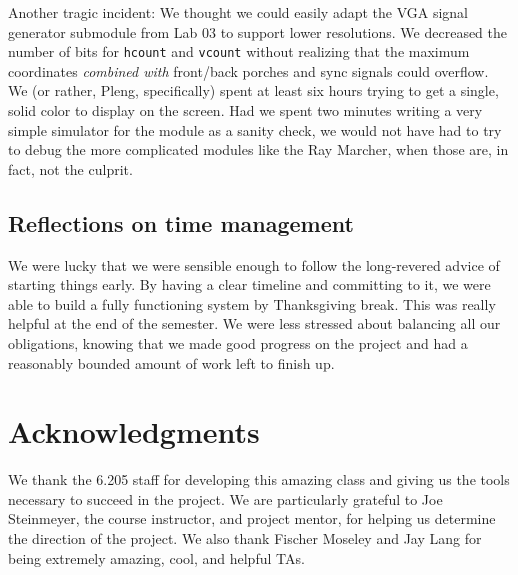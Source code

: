 \documentclass[conference]{IEEEtran}
\begin{document}
Another tragic incident: We thought we could easily adapt the VGA signal generator submodule from Lab 03 to support lower resolutions. We decreased the number of bits for \texttt{hcount} and \texttt{vcount} without realizing that the maximum coordinates \textit{combined with} front/back porches and sync signals could overflow. We (or rather, Pleng, specifically) spent at least six hours trying to get a single, solid color to display on the screen. Had we spent two minutes writing a very simple simulator for the module as a sanity check, we would not have had to try to debug the more complicated modules like the Ray Marcher, when those are, in fact, not the culprit.

\subsection{Reflections on time management}

We were lucky that we were sensible enough to follow the long-revered advice of starting things early. By having a clear timeline and committing to it, we were able to build a fully functioning system by Thanksgiving break. This was really helpful at the end of the semester. We were less stressed about balancing all our obligations, knowing that we made good progress on the project and had a reasonably bounded amount of work left to finish up.


\section*{Acknowledgments}

We thank the 6.205 staff for developing this amazing class and giving us the tools necessary to succeed in the project. We are particularly grateful to Joe Steinmeyer, the course instructor, and project mentor, for helping us determine the direction of the project. We also thank Fischer Moseley and Jay Lang for being extremely amazing, cool, and helpful TAs.
\end{document}
